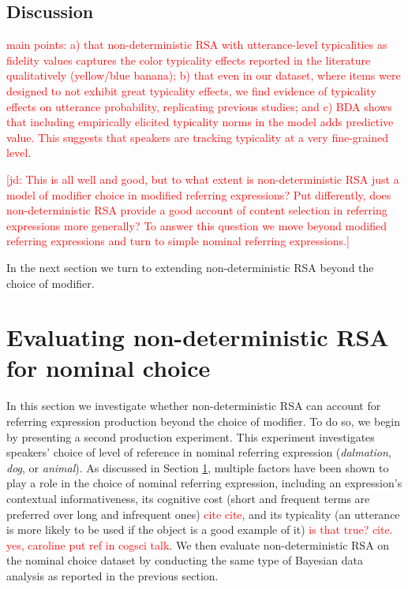 \documentclass[11pt]{article}
\newcommand{\red}[1]{\textcolor{Red}{#1}}
\newcommand{\jd}[1]{\textcolor{Red}{[jd: #1]}}
\newcommand{\sectionref}[1]{Section \ref{#1}}
\begin{document}
\subsection{Discussion}

\red{main points: a) that non-deterministic RSA with utterance-level typicalities as fidelity values captures the color typicality effects reported in the literature qualitatively (yellow/blue banana); b) that even in our dataset, where items were designed to not exhibit great typicality effects, we find evidence of typicality effects on utterance probability, replicating previous studies; and c) BDA shows that including empirically elicited typicality norms in the model adds predictive value. This suggests that speakers are tracking typicality at a very fine-grained level}.

\jd{This is all well and good, but to what extent is non-deterministic RSA just a model of modifier choice in modified referring expressions? Put differently, does non-deterministic RSA provide a good account of content selection in referring expressions more generally? To answer this question we move beyond modified referring expressions and turn to simple nominal referring expressions.}

In the next section we turn to extending non-deterministic RSA beyond the choice of modifier.

\section{Evaluating non-deterministic RSA for nominal choice}
\label{sec:nominal}

In this section we investigate whether non-deterministic RSA can account for referring expression production beyond the choice of modifier. To do so, we begin by presenting a  second production experiment. This experiment investigates speakers' choice of level of reference in nominal referring expression (\emph{dalmation}, \emph{dog}, or \emph{animal}). As discussed in \sectionref{sec:nominal},  multiple factors have been shown to play a role in the choice of nominal referring expression, including an expression's contextual informativeness, its cognitive cost (short and frequent terms are preferred over long and infrequent ones) \red{cite cite}, and its typicality (an utterance is more likely to be used if the object is a good example of it) \red{is that true? cite. yes, caroline put ref in cogsci talk}.   We then evaluate non-deterministic RSA on the nominal choice dataset by conducting the same type of Bayesian data analysis as reported in the previous section.
\end{document}
